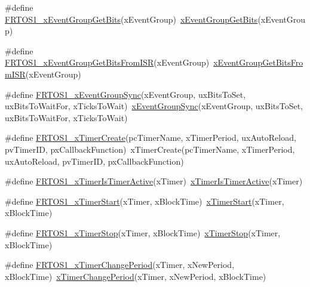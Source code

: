 \begin{DoxyCompactItemize}
\item 
\#define \hyperlink{group___f_r_t_o_s1__module_gae2840ba8082df53fca51d57763cc7b0c}{F\+R\+T\+O\+S1\+\_\+x\+Event\+Group\+Get\+Bits}(x\+Event\+Group)~\hyperlink{event__groups_8h_a0ae86f092fb07ccb475ae938f9a12584}{x\+Event\+Group\+Get\+Bits}(x\+Event\+Group)
\item 
\#define \hyperlink{group___f_r_t_o_s1__module_ga864e1abb78f3c4ef96e55fa5edf61d86}{F\+R\+T\+O\+S1\+\_\+x\+Event\+Group\+Get\+Bits\+From\+I\+SR}(x\+Event\+Group)~\hyperlink{event__groups_8h_a95822db4357d0b77c35aed0c7427eca0}{x\+Event\+Group\+Get\+Bits\+From\+I\+SR}(x\+Event\+Group)
\item 
\#define \hyperlink{group___f_r_t_o_s1__module_ga7154669843c8ffcb0b8047558cfe33eb}{F\+R\+T\+O\+S1\+\_\+x\+Event\+Group\+Sync}(x\+Event\+Group,  ux\+Bits\+To\+Set,  ux\+Bits\+To\+Wait\+For,  x\+Ticks\+To\+Wait)~\hyperlink{event__groups_8h_a869511456b86426f52e2eec898bff341}{x\+Event\+Group\+Sync}(x\+Event\+Group, ux\+Bits\+To\+Set, ux\+Bits\+To\+Wait\+For, x\+Ticks\+To\+Wait)
\item 
\#define \hyperlink{group___f_r_t_o_s1__module_ga998dd1002dc0119219ef6ccd6bf5e5b7}{F\+R\+T\+O\+S1\+\_\+x\+Timer\+Create}(pc\+Timer\+Name,  x\+Timer\+Period,  ux\+Auto\+Reload,  pv\+Timer\+ID,  px\+Callback\+Function)~x\+Timer\+Create(pc\+Timer\+Name, x\+Timer\+Period, ux\+Auto\+Reload, pv\+Timer\+ID, px\+Callback\+Function)
\item 
\#define \hyperlink{group___f_r_t_o_s1__module_gac2a1918e4cb5def0bb5e75d2800ffae8}{F\+R\+T\+O\+S1\+\_\+x\+Timer\+Is\+Timer\+Active}(x\+Timer)~\hyperlink{timers_8h_a2cd9b1399fb25203be698f123846dc33}{x\+Timer\+Is\+Timer\+Active}(x\+Timer)
\item 
\#define \hyperlink{group___f_r_t_o_s1__module_gadde1abf221f90cfea859799e54320aba}{F\+R\+T\+O\+S1\+\_\+x\+Timer\+Start}(x\+Timer,  x\+Block\+Time)~\hyperlink{timers_8h_a3a9b838f48991e852ce05c986b0eeb8c}{x\+Timer\+Start}(x\+Timer, x\+Block\+Time)
\item 
\#define \hyperlink{group___f_r_t_o_s1__module_gabb40a93c1aac5b401432f89a7844bcd4}{F\+R\+T\+O\+S1\+\_\+x\+Timer\+Stop}(x\+Timer,  x\+Block\+Time)~\hyperlink{timers_8h_a8327c7fc10aee414cb163b445c5269a4}{x\+Timer\+Stop}(x\+Timer, x\+Block\+Time)
\item 
\#define \hyperlink{group___f_r_t_o_s1__module_ga9575ef52338eb3c6f66e019595582fc9}{F\+R\+T\+O\+S1\+\_\+x\+Timer\+Change\+Period}(x\+Timer,  x\+New\+Period,  x\+Block\+Time)~\hyperlink{timers_8h_ab12eac1c69a3437b8161ce81ff34b2f4}{x\+Timer\+Change\+Period}(x\+Timer, x\+New\+Period, x\+Block\+Time)

\end{DoxyCompactItemize}
